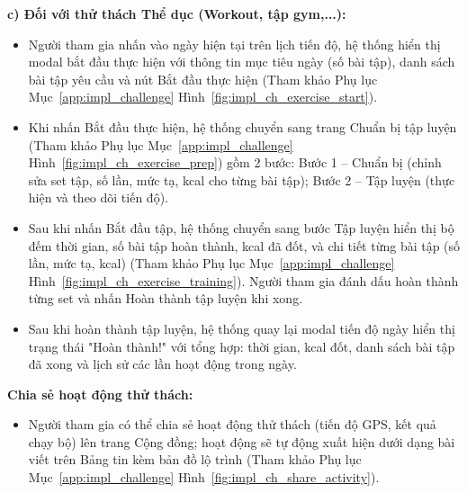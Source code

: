 \textbf{c) Đối với thử thách Thể dục (Workout, tập gym,...):}
\begin{itemize}
    \item Người tham gia nhấn vào ngày hiện tại trên lịch tiến độ, hệ thống hiển thị modal bắt đầu thực hiện với thông tin mục tiêu ngày (số bài tập), danh sách bài tập yêu cầu và nút Bắt đầu thực hiện (Tham khảo Phụ lục Mục~\ref{app:impl_challenge} Hình~\ref{fig:impl_ch_exercise_start}).


    \item Khi nhấn Bắt đầu thực hiện, hệ thống chuyển sang trang Chuẩn bị tập luyện (Tham khảo Phụ lục Mục~\ref{app:impl_challenge} Hình~\ref{fig:impl_ch_exercise_prep}) gồm 2 bước: Bước 1 -- Chuẩn bị (chỉnh sửa set tập, số lần, mức tạ, kcal cho từng bài tập); Bước 2 -- Tập luyện (thực hiện và theo dõi tiến độ).


    \item Sau khi nhấn Bắt đầu tập, hệ thống chuyển sang bước Tập luyện hiển thị bộ đếm thời gian, số bài tập hoàn thành, kcal đã đốt, và chi tiết từng bài tập (số lần, mức tạ, kcal) (Tham khảo Phụ lục Mục~\ref{app:impl_challenge} Hình~\ref{fig:impl_ch_exercise_training}). Người tham gia đánh dấu hoàn thành từng set và nhấn Hoàn thành tập luyện khi xong.


    \item Sau khi hoàn thành tập luyện, hệ thống quay lại modal tiến độ ngày hiển thị trạng thái "Hoàn thành!" với tổng hợp: thời gian, kcal đốt, danh sách bài tập đã xong và lịch sử các lần hoạt động trong ngày.

\end{itemize}

\textbf{Chia sẻ hoạt động thử thách:}
\begin{itemize}
    \item Người tham gia có thể chia sẻ hoạt động thử thách (tiến độ GPS, kết quả chạy bộ) lên trang Cộng đồng; hoạt động sẽ tự động xuất hiện dưới dạng bài viết trên Bảng tin kèm bản đồ lộ trình (Tham khảo Phụ lục Mục~\ref{app:impl_challenge} Hình~\ref{fig:impl_ch_share_activity}).

\end{itemize}

